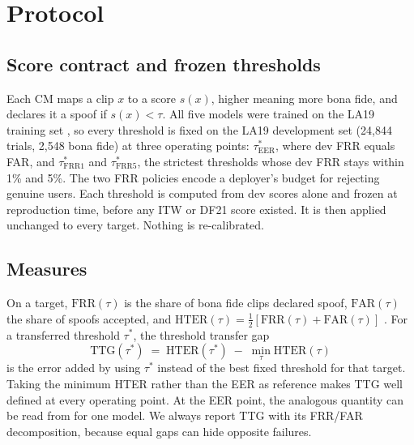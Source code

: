 \documentclass[conference]{IEEEtran}
\newcommand{\ttg}{\mathrm{TTG}}
\newcommand{\hter}{\mathrm{HTER}}
\newcommand{\frr}{\mathrm{FRR}}
\newcommand{\far}{\mathrm{FAR}}
\newcommand{\tauE}{\tau^{*}_{\mathrm{EER}}}
\newcommand{\tauF}[1]{\tau^{*}_{\mathrm{FRR}#1}}
\begin{document}
\section{Protocol}
\label{sec:protocol}

\subsection{Score contract and frozen thresholds}
Each CM maps a clip \(x\) to a score \(s(x)\), higher meaning more bona fide,
and declares it a spoof if \(s(x)<\tau\). All five models were trained on the
LA19 training set \cite{wang20_asvspoof2019}, so every threshold is fixed on the
LA19 development set (24,844 trials, 2,548 bona fide) at three operating
points: \(\tauE\), where dev FRR equals FAR, and \(\tauF{1}\) and \(\tauF{5}\),
the strictest thresholds whose dev FRR stays within 1\% and 5\%. The two FRR
policies encode a deployer's budget for rejecting genuine users. Each threshold
is computed from dev scores alone and frozen at reproduction time, before any
ITW or DF21 score existed. It is then applied unchanged to every target.
Nothing is re-calibrated.

\subsection{Measures}
On a target, \(\frr(\tau)\) is the share of bona fide clips declared spoof,
\(\far(\tau)\) the share of spoofs accepted, and
\(\hter(\tau)=\tfrac12[\frr(\tau)+\far(\tau)]\) \cite{bengio04_hter}. For a
transferred threshold \(\tau^{*}\), the threshold transfer gap
\begin{equation}
\ttg(\tau^{*}) \;=\; \hter(\tau^{*}) \;-\; \min_{\tau}\hter(\tau)
\label{eq:ttg}
\end{equation}
is the error added by using \(\tau^{*}\) instead of the best fixed threshold
for that target. Taking the minimum HTER rather than the EER as reference makes
TTG well defined at every operating point. At the EER point, the analogous
quantity can be read from \cite{zhou26_eer_hides} for one model. We always
report TTG with its FRR/FAR decomposition, because equal gaps can hide opposite
failures.
\end{document}
